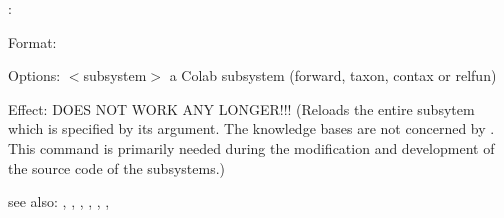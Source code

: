 \colab{} \reload:

Format: 

Options: $<$subsystem$>$ a Colab subsystem 
         (forward, taxon, contax or relfun)
          
Effect: DOES NOT WORK ANY LONGER!!!
	(Reloads the entire subsytem which is specified by its argument.
	The knowledge bases are not concerned by \reload.
        This command is primarily needed during the modification and
        development of the source code of the \COLAB{} subsystems.)
         
see also: \relfun, \rfi, \rfe, \forward, \contax, \taxon, \colab
